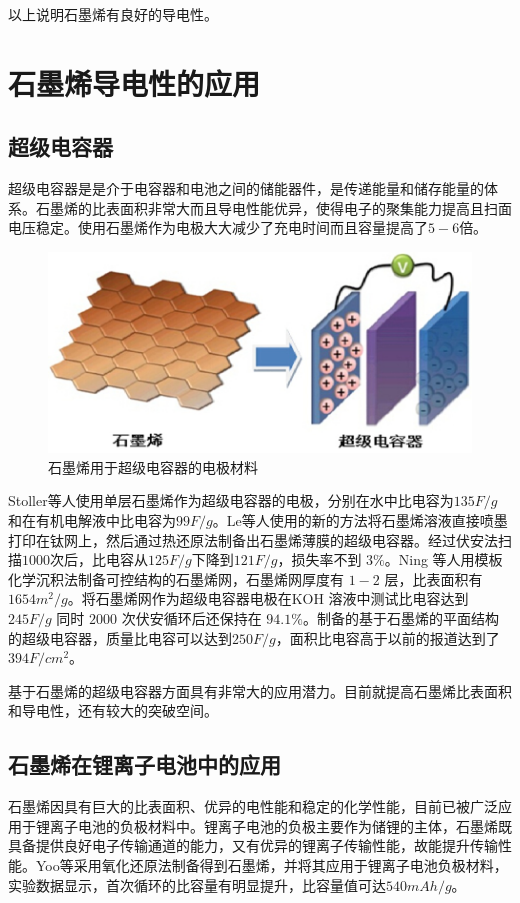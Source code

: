 以上说明石墨烯有良好的导电性。


\section{石墨烯导电性的应用}
\subsection{超级电容器}
超级电容器是是介于电容器和电池之间的储能器件，是传递能量和储存能量的体系。石墨烯的比表面积非常大而且导电性能优异，使得电子的聚集能力提高且扫面电压稳定。使用石墨烯作为电极大大减少了充电时间而且容量提高了$5-6$倍。

\begin{figure}[H]
  \centering
  \includegraphics[scale=0.8]{img/石墨烯用于超级电容器的电极材料.png}
  \caption{石墨烯用于超级电容器的电极材料}
\end{figure}

Stoller等人使用单层石墨烯作为超级电容器的电极，分别在水中比电容为$135F/g$ 和在有机电解液中比电容为$99F/g$。Le等人使用的新的方法将石墨烯溶液直接喷墨打印在钛网上，然后通过热还原法制备出石墨烯薄膜的超级电容器。经过伏安法扫描$1000 $次后，比电容从$ 125F/g $下降到$121F/g$，损失率不到 $3\%$。Ning 等人用模板化学沉积法制备可控结构的石墨烯网，石墨烯网厚度有 $1-2$ 层，比表面积有$1654m^{2}/g$。将石墨烯网作为超级电容器电极在KOH 溶液中测试比电容达到$245F/g$ 同时 $2000$ 次伏安循环后还保持在 $94.1\%$。制备的基于石墨烯的平面结构的超级电容器，质量比电容可以达到$250F/g$，面积比电容高于以前的报道达到了$394F/cm^{2}$。

基于石墨烯的超级电容器方面具有非常大的应用潜力。目前就提高石墨烯比表面积和导电性，还有较大的突破空间。\cite{wangqingkai}


\subsection{石墨烯在锂离子电池中的应用}
石墨烯因具有巨大的比表面积、优异的电性能和稳定的化学性能，目前已被广泛应用于锂离子电池的负极材料中。锂离子电池的负极主要作为储锂的主体，石墨烯既具备提供良好电子传输通道的能力，又有优异的锂离子传输性能，故能提升传输性能。Yoo等采用氧化还原法制备得到石墨烯，并将其应用于锂离子电池负极材料，实验数据显示，首次循环的比容量有明显提升，比容量值可达$540 mAh/g$。

